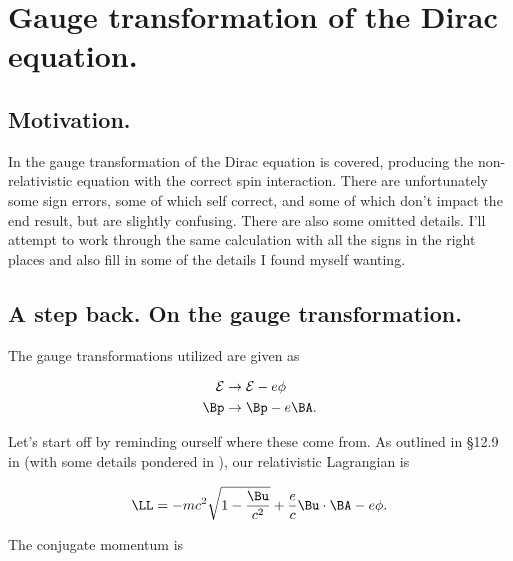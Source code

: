 
%

\newcommand{\pslash}[0]{\cancel{p}}

\chapter{Gauge transformation of the Dirac equation.}
\label{chap:diracGauge}
{}
\date{Aug 4, 2011}

\beginArtWithToc

\section{Motivation.}

In \cite{desai2009quantum} the gauge transformation of the Dirac equation is covered, producing the non-relativistic equation with the correct spin interaction.  There are unfortunately some sign errors, some of which self correct, and some of which don't impact the end result, but are slightly confusing.  There are also some omitted details.  I'll attempt to work through the same calculation with all the signs in the right places and also fill in some of the details I found myself wanting.

\section{A step back.  On the gauge transformation.}

The gauge transformations utilized are given as

\begin{align}\label{eqn:diracGauge:10}
\mathcal{E} &\rightarrow \mathcal{E} - e \phi \\
\Bp &\rightarrow \Bp - e \BA.
\end{align}

Let's start off by reminding ourself where these come from.  As outlined in \S 12.9 in \cite{jackson1975cew} (with some details pondered in \cite{miscphysics:hamiltonian}), our relativistic Lagrangian is

\begin{equation}\label{eqn:diracGauge:30}
\LL = -m c^2 \sqrt{ 1 - \frac{\Bu}{c^2}} + \frac{e}{c} \Bu \cdot \BA - e \phi.
\end{equation}

The conjugate momentum is

